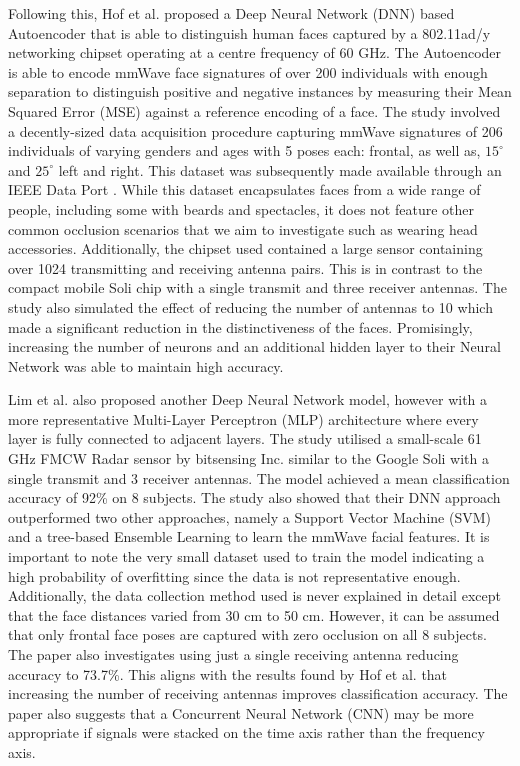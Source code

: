 \documentclass{interim}
\begin{document}
Following this, Hof et al. \cite{hof2020face} proposed a Deep Neural Network (DNN) based Autoencoder that is able to distinguish human faces captured by a 802.11ad/y networking chipset operating at a centre frequency of 60 GHz. The Autoencoder is able to encode mmWave face signatures of over 200 individuals with enough separation to distinguish positive and negative instances by measuring their Mean Squared Error (MSE) against a reference encoding of a face. The study involved a decently-sized data acquisition procedure capturing mmWave signatures of 206 individuals of varying genders and ages with 5 poses each: frontal, as well as, $15^\circ$ and $25^\circ$ left and right. This dataset was subsequently made available through an IEEE Data Port \cite{mmwavefacedata}. While this dataset encapsulates faces from a wide range of people, including some with beards and spectacles, it does not feature other common occlusion scenarios that we aim to investigate such as wearing head accessories. Additionally, the chipset used contained a large sensor containing over 1024 transmitting and receiving antenna pairs. This is in contrast to the compact mobile Soli chip with a single transmit and three receiver antennas. The study also simulated the effect of reducing the number of antennas to 10 which made a significant reduction in the distinctiveness of the faces. Promisingly, increasing the number of neurons and an additional hidden layer to their Neural Network was able to maintain high accuracy.

Lim et al. \cite{lim2020dnn} also proposed another Deep Neural Network model, however with a more representative Multi-Layer Perceptron (MLP) architecture where every layer is fully connected to adjacent layers. The study utilised a small-scale 61 GHz FMCW Radar sensor by bitsensing Inc. similar to the Google Soli with a single transmit and 3 receiver antennas. The model achieved a mean classification accuracy of 92\% on 8 subjects. The study also showed that their DNN approach outperformed two other approaches, namely a Support Vector Machine (SVM) and a tree-based Ensemble Learning to learn the mmWave facial features. It is important to note the very small dataset used to train the model indicating a high probability of overfitting since the data is not representative enough. Additionally, the data collection method used is never explained in detail except that the face distances varied from 30 cm to 50 cm. However, it can be assumed that only frontal face poses are captured with zero occlusion on all 8 subjects. The paper also investigates using just a single receiving antenna reducing accuracy to 73.7\%. This aligns with the results found by Hof et al. \cite{hof2020face} that increasing the number of receiving antennas improves classification accuracy. The paper also suggests that a Concurrent Neural Network (CNN) may be more appropriate if signals were stacked on the time axis rather than the frequency axis.
\end{document}
